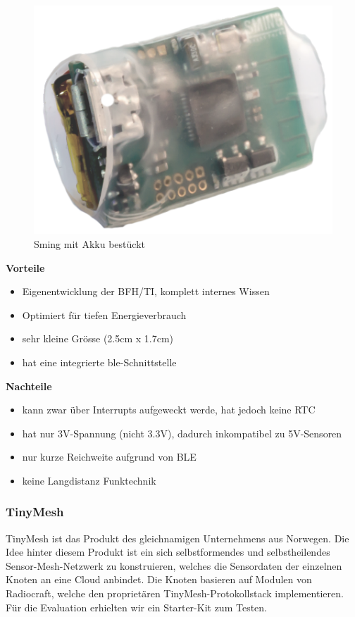 \begin{figure}[H]
     \centering
        \includegraphics[scale=0.6]{pictures/Sming.png}
    \caption{Sming mit Akku bestückt}
    \label{fig:Sming}
\end{figure}

\textbf{Vorteile}
\begin{itemize}
\item Eigenentwicklung der BFH/TI, komplett internes Wissen
\item Optimiert für tiefen Energieverbrauch
\item sehr kleine Grösse (2.5cm x 1.7cm)
\item hat eine integrierte \gls{ble}-Schnittstelle
\end{itemize}
\textbf{Nachteile}
\begin{itemize}
\item kann zwar über Interrupts aufgeweckt werde, hat jedoch keine RTC
\item hat nur 3V-Spannung (nicht 3.3V), dadurch inkompatibel zu 5V-Sensoren
\item nur kurze Reichweite aufgrund von BLE
\item keine Langdistanz Funktechnik
\end{itemize}

\newpage

\subsubsection*{TinyMesh}
TinyMesh ist das Produkt des gleichnamigen Unternehmens aus Norwegen. Die Idee hinter diesem Produkt ist ein sich selbstformendes und selbstheilendes Sensor-Mesh-Netzwerk zu konstruieren, welches die Sensordaten der einzelnen Knoten an eine Cloud anbindet. Die Knoten basieren auf Modulen von Radiocraft, welche den proprietären TinyMesh-Protokollstack implementieren. Für die Evaluation erhielten wir ein Starter-Kit zum Testen.

